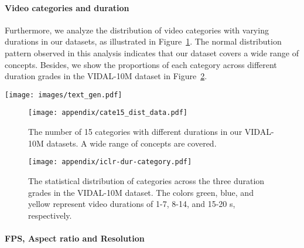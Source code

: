 \documentclass{article} \usepackage{iclr2024_conference,times}
\begin{document}
\paragraph{Video categories and duration}
Furthermore, we analyze the distribution of video categories with varying durations in our datasets, as illustrated in Figure~\ref{fig:cate_dist}. The normal distribution pattern observed in this analysis indicates that our dataset covers a wide range of concepts. Besides, we show the proportions of each category across different duration grades in the VIDAL-10M dataset in Figure~\ref{fig:dur-category}.



\begin{figure*}[htpb]\centerline{\texttt{[image: images/text\_gen.pdf]}}
    \caption{\textbf{Multi-view text generation and enhancement pipline}. 
    We employ the OFA model to generate keyframe captions and input video, title and hashtags into the mPLUG-owl model to obtain video captions. The video captions are further refined using ChatGPT, resulting in the ChatGPT-mPLUG caption. The final multi-view textual description comprises these components. 
}  
    \label{fig:multi-view text generation and enhancement}
\end{figure*}





\begin{figure}

\centerline{\texttt{[image: appendix/cate15\_dist\_data.pdf]}}
  \caption{The number of 15 categories with different durations in our VIDAL-10M datasets. A wide range of concepts are covered.}  
  \label{fig:cate_dist}
\vspace{-1cm} 
\end{figure}

\begin{figure}[H]
  \centerline{\texttt{[image: appendix/iclr-dur-category.pdf]}}
  \caption{The statistical distribution of categories across the three duration grades in the VIDAL-10M dataset. The colors green, blue, and yellow represent video durations of 1-7, 8-14, and 15-20 s, respectively.}  
  \label{fig:dur-category}
\vspace{-0.4cm} 
\end{figure}


\paragraph{FPS, Aspect ratio and Resolution}
\end{document}
